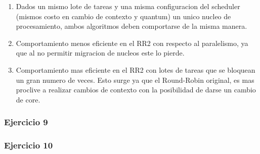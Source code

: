 \begin{enumerate}
 \item Dados un mismo lote de tareas y una misma configuracion del scheduler (mismos costo en cambio
de contexto y quantum) un unico nucleo de procesamiento, ambos algoritmos deben comportarse
de la misma manera.
\item Comportamiento menos eficiente en el RR2 con respecto al paralelismo, ya que al no permitir
migracion de nucleos este lo pierde.
\item Comportamiento mas eficiente en el RR2 con lotes de tareas que se bloquean un gran numero
de veces. Esto surge ya que el Round-Robin original, es mas proclive a realizar cambios de contexto con la posibilidad
de darse un cambio de core.
\end{enumerate}


  
\subsubsection[Resolución Ejercicio 9]{Ejercicio 9}

\subsubsection[Resolución Ejercicio 10]{Ejercicio 10}
